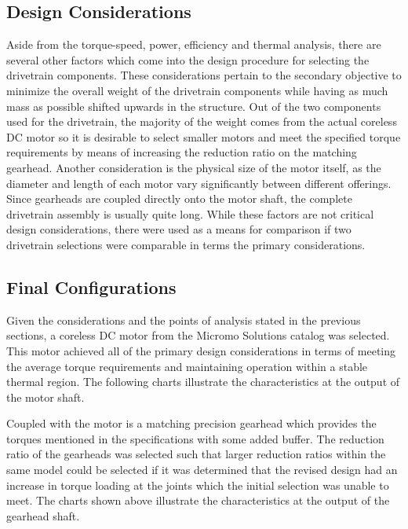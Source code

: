 \subsection{Design Considerations} %
\label{sub:design_considerations}
Aside from the torque-speed, power, efficiency and thermal analysis, there are several other factors which come into the design procedure for selecting the drivetrain components. These considerations pertain to the secondary objective to minimize the overall weight of the drivetrain components while having as much mass as possible shifted upwards in the structure. Out of the two components used for the drivetrain, the majority of the weight comes from the actual coreless DC motor so it is desirable to select smaller motors and meet the specified torque requirements by means of increasing the reduction ratio on the matching gearhead. Another consideration is the physical size of the motor itself, as the diameter and length of each motor vary significantly between different offerings. Since gearheads are coupled directly onto the motor shaft, the complete drivetrain assembly is usually quite long. While these factors are not critical design considerations, there were used as a means for comparison if two drivetrain selections were comparable in terms the primary considerations.%


\subsection{Final Configurations} %
\label{sub:final_configurations}

Given the considerations and the points of analysis stated in the previous sections, a coreless DC motor from the Micromo Solutions catalog was selected. This motor achieved all of the primary design considerations in terms of meeting the average torque requirements and maintaining operation within a stable thermal region. The following charts illustrate the characteristics at the output of the motor shaft. 

Coupled with the motor is a matching precision gearhead which provides the torques mentioned in the specifications with some added buffer. The reduction ratio of the gearheads was selected such that larger reduction ratios within the same model could be selected if it was determined that the revised design had an increase in torque loading at the joints which the initial selection was unable to meet. The charts shown above illustrate the characteristics at the output of the gearhead shaft.

